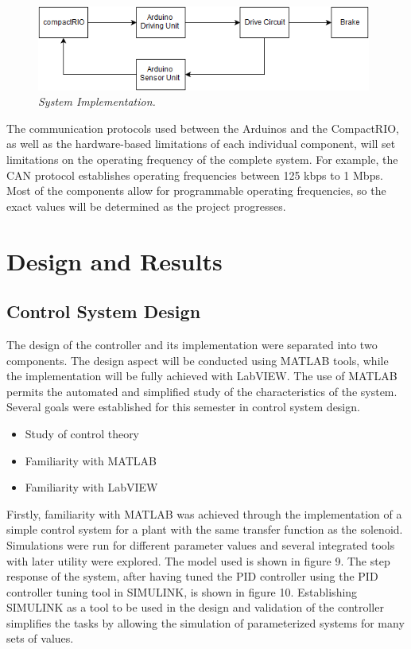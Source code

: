 \documentclass{article}
\begin{document}
\begin{figure}[!ht]
\centering 
\includegraphics[width=11cm]{fig_8.png}
\caption{\small \sl System Implementation.}  
\end{figure}

\noindent The communication protocols used between the Arduinos and the CompactRIO, as well as the hardware-based limitations of each individual component, will set limitations on the operating frequency of the complete system. For example, the CAN protocol establishes operating frequencies between 125 kbps to 1 Mbps. Most of the components allow for programmable operating frequencies, so the exact values will be determined as the project progresses. 

\section{Design and Results}
\subsection{Control System Design}

The design of the controller and its implementation were separated into two components. The design aspect will be conducted using MATLAB tools, while the implementation will be fully achieved with LabVIEW. The use of MATLAB permits the automated and simplified study of the characteristics of the system. Several goals were established for this semester in control system design. 

\begin{itemize}
	\item Study of control theory
    \item Familiarity with MATLAB
    \item Familiarity with LabVIEW 
\end{itemize}

\noindent Firstly, familiarity with MATLAB was achieved through the implementation of a simple control system for a plant with the same transfer function as the solenoid. Simulations were run for different parameter values and several integrated tools with later utility were explored. The model used is shown in figure 9. The step response of the system, after having tuned the PID controller using the PID controller tuning tool in SIMULINK, is shown in figure 10. Establishing SIMULINK as a tool to be used in the design and validation of the controller simplifies the tasks by allowing the simulation of parameterized systems for many sets of values.\\
\end{document}
